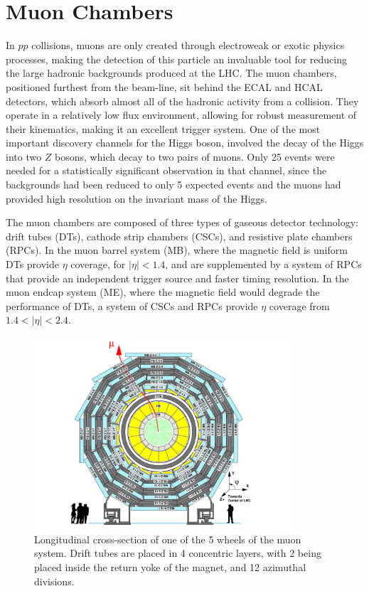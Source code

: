 \section{Muon Chambers}
\label{muon_chamber_description}

\par In $pp$ collisions, muons are only created through electroweak or
exotic physics processes, making the detection of this particle an
invaluable tool for reducing the large hadronic backgrounds produced
at the LHC.  The muon chambers, positioned furthest from the beam-line,
sit behind the ECAL and HCAL detectors, which absorb almost all of the
hadronic activity from a collision.  They operate in a relatively low
flux environment, allowing for robust measurement of their
kinematics, making it an excellent trigger system.  One of the most
important discovery channels for the  Higgs boson, involved the decay of
the Higgs into two $Z$ bosons, which decay to two pairs of muons.
Only 25 events were needed for a statistically significant observation
in that channel, since the backgrounds had been reduced to only 5
expected events and the muons had provided high resolution on the
invariant mass of the Higgs.   

\par The muon chambers are composed of three types of gaseous detector
technology: drift tubes (DTs), cathode strip chambers (CSCs), and
resistive plate chambers (RPCs).  In the muon barrel system (MB),
where the magnetic field is uniform DTs provide $\eta$ coverage, for
$|\eta|<1.4$, and are supplemented by a system of RPCs that provide an
independent trigger source and faster timing resolution.  In the muon
endcap system (ME), where the magnetic field would degrade the
performance of DTs, a system of CSCs and RPCs provide $\eta$ coverage
from $1.4<|\eta|<2.4$.  

\begin{figure}[h]
   \centering
  \includegraphics[width=0.85\textwidth]{Figures/CMS_Diagrams/Muon__DT_layout.pdf}
  \caption{Longitudinal cross-section of one of the 5 wheels of the
    muon system.  Drift tubes are placed in 4 concentric layers, with
    2 being placed inside the return yoke of the magnet, and 12
    azimuthal divisions.} \label{fig:muon_dt_layout}
\end{figure}


